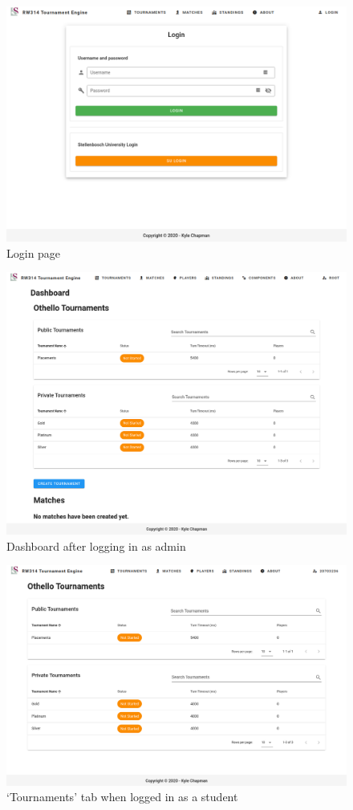 \documentclass[a4paper, 12pt]{report}
\begin{document}
\begin{figure}[H]
	\centering
	\includegraphics[scale=0.41]{login.png}
	\caption{Login page}
	\label{fig:login}
\end{figure}
\begin{figure}[H]
	\centering
	\includegraphics[scale=0.37]{dashboard-admin.png}
	\caption{Dashboard after logging in as admin}
	\label{fig:dashboard-admin}
\end{figure}
\begin{figure}[H]
	\centering
	\includegraphics[scale=0.33]{all-tournaments-student.png}
	\caption{`Tournaments' tab when logged in as a student}
	\label{fig:all-tourn-student}
\end{figure}
\end{document}
